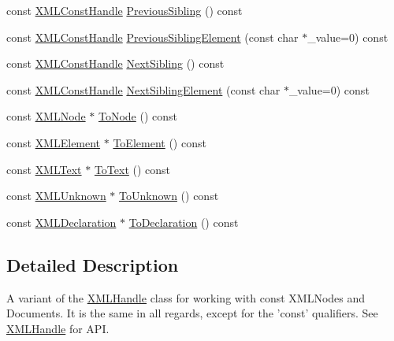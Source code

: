 \begin{DoxyCompactItemize}
\item 
const \hyperlink{classtinyxml2_1_1_x_m_l_const_handle}{X\-M\-L\-Const\-Handle} \hyperlink{classtinyxml2_1_1_x_m_l_const_handle_a6917564e26b2c20ebdcb23c7940ad80a}{Previous\-Sibling} () const 
\item 
const \hyperlink{classtinyxml2_1_1_x_m_l_const_handle}{X\-M\-L\-Const\-Handle} \hyperlink{classtinyxml2_1_1_x_m_l_const_handle_acb2e1c5762eff9f6ed72d1a2dfc14271}{Previous\-Sibling\-Element} (const char $\ast$\-\_\-value=0) const 
\item 
const \hyperlink{classtinyxml2_1_1_x_m_l_const_handle}{X\-M\-L\-Const\-Handle} \hyperlink{classtinyxml2_1_1_x_m_l_const_handle_a596e248c8014d718f41658502a2e221b}{Next\-Sibling} () const 
\item 
const \hyperlink{classtinyxml2_1_1_x_m_l_const_handle}{X\-M\-L\-Const\-Handle} \hyperlink{classtinyxml2_1_1_x_m_l_const_handle_a3bbdd3d866c750473bd69a232704503b}{Next\-Sibling\-Element} (const char $\ast$\-\_\-value=0) const 
\item 
const \hyperlink{classtinyxml2_1_1_x_m_l_node}{X\-M\-L\-Node} $\ast$ \hyperlink{classtinyxml2_1_1_x_m_l_const_handle_a95d0256318c10c3f75fa5f8ffb3e4bc1}{To\-Node} () const 
\item 
const \hyperlink{classtinyxml2_1_1_x_m_l_element}{X\-M\-L\-Element} $\ast$ \hyperlink{classtinyxml2_1_1_x_m_l_const_handle_a5a48adefc2a5e70d4ce5b55692a0e2f9}{To\-Element} () const 
\item 
const \hyperlink{classtinyxml2_1_1_x_m_l_text}{X\-M\-L\-Text} $\ast$ \hyperlink{classtinyxml2_1_1_x_m_l_const_handle_ad86ca7dbb20d0495ae357fe7a866e0be}{To\-Text} () const 
\item 
const \hyperlink{classtinyxml2_1_1_x_m_l_unknown}{X\-M\-L\-Unknown} $\ast$ \hyperlink{classtinyxml2_1_1_x_m_l_const_handle_acb358a329e54fa204ed2d0b181566828}{To\-Unknown} () const 
\item 
const \hyperlink{classtinyxml2_1_1_x_m_l_declaration}{X\-M\-L\-Declaration} $\ast$ \hyperlink{classtinyxml2_1_1_x_m_l_const_handle_a5de0c175845bc30a6f9b3d88d8877eaf}{To\-Declaration} () const 
\end{DoxyCompactItemize}


\subsection{Detailed Description}
A variant of the \hyperlink{classtinyxml2_1_1_x_m_l_handle}{X\-M\-L\-Handle} class for working with const X\-M\-L\-Nodes and Documents. It is the same in all regards, except for the 'const' qualifiers. See \hyperlink{classtinyxml2_1_1_x_m_l_handle}{X\-M\-L\-Handle} for A\-P\-I. 


